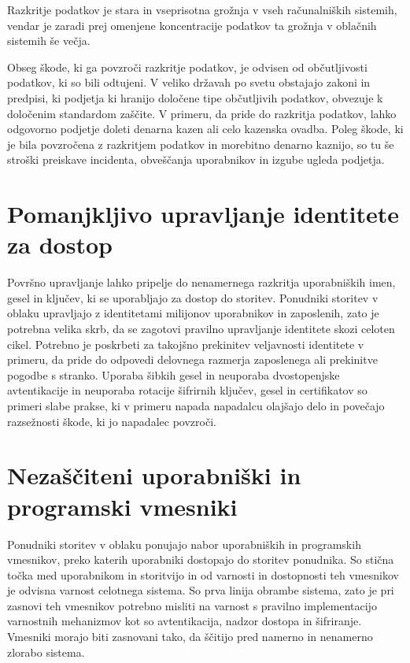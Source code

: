 \documentclass[12pt,a4paper,openany,tikz]{book}
\theoremstyle{plain}
\theoremstyle{definition}
\begin{document}
Razkritje podatkov je stara in vseprisotna grožnja v vseh računalniških sistemih, vendar je zaradi prej omenjene koncentracije podatkov ta grožnja v oblačnih sistemih še večja.

Obseg škode, ki ga povzroči razkritje podatkov, je odvisen od občutljivosti podatkov, ki so bili odtujeni. V veliko državah po svetu obstajajo zakoni in predpisi, ki podjetja ki hranijo določene tipe občutljivih podatkov, obvezuje k določenim standardom zaščite. V primeru, da pride do razkritja podatkov, lahko odgovorno podjetje doleti denarna kazen ali celo kazenska ovadba. Poleg škode, ki je bila povzročena z razkritjem podatkov in morebitno denarno kaznijo, so tu še stroški preiskave incidenta, obveščanja uporabnikov in izgube ugleda podjetja.

\section{Pomanjkljivo upravljanje identitete za dostop}
\label{sub:Pomanjkljivo upravljanje identitete za dostop}

Površno upravljanje lahko pripelje do nenamernega razkritja uporabniških imen, gesel in ključev, ki se uporabljajo za dostop do storitev. Ponudniki storitev v oblaku upravljajo z identitetami milijonov uporabnikov in zaposlenih, zato je potrebna velika skrb, da se zagotovi pravilno upravljanje identitete skozi celoten cikel. Potrebno je poskrbeti za takojšno prekinitev veljavnosti identitete v primeru, da pride do odpovedi delovnega razmerja zaposlenega ali prekinitve pogodbe s stranko. Uporaba šibkih gesel in neuporaba dvostopenjske avtentikacije in neuporaba rotacije šifrirnih ključev, gesel in certifikatov so primeri slabe prakse, ki v primeru napada napadalcu olajšajo delo in povečajo razsežnosti škode, ki jo napadalec povzroči.

\section{Nezaščiteni uporabniški in programski vmesniki}
\label{sub:Nezaščiteni uporabniški in programski vmesniki}

Ponudniki storitev v oblaku ponujajo nabor uporabniških in programskih vmesnikov, preko katerih uporabniki dostopajo do storitev ponudnika. So stična točka med uporabnikom in storitvijo in od varnosti in dostopnosti teh vmesnikov je odvisna varnost celotnega sistema. So prva linija obrambe sistema, zato je pri zasnovi teh vmesnikov potrebno misliti na varnost s pravilno implementacijo varnostnih mehanizmov kot so avtentikacija, nadzor dostopa in šifriranje. Vmesniki morajo biti zasnovani tako, da ščitijo pred namerno in nenamerno zlorabo sistema.
\end{document}
